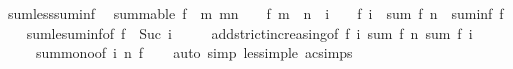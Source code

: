 \begin{isabellebody}
\isanewline
\isanewline
{}\isamarkupfalse%
\ sum{\isacharunderscore}{\kern0pt}less{\isacharunderscore}{\kern0pt}suminf{}{\isacharcolon}{\kern0pt}\isanewline
\ \ {\isachardoublequoteopen}summable\ f\ {\isasymLongrightarrow}\ {\isacharparenleft}{\kern0pt}{\isasymAnd}m{\isachardot}{\kern0pt}\ m{\isasymge}n\ {\isasymLongrightarrow}\ {}\ {\isasymle}\ f\ m{\isacharparenright}{\kern0pt}\ {\isasymLongrightarrow}\ n\ {\isasymle}\ i\ {\isasymLongrightarrow}\ {}\ {\isacharless}{\kern0pt}\ f\ i\ {\isasymLongrightarrow}\ sum\ f\ {\isacharbraceleft}{\kern0pt}{\isachardot}{\kern0pt}{\isachardot}{\kern0pt}{\isacharless}{\kern0pt}n{\isacharbraceright}{\kern0pt}\ {\isacharless}{\kern0pt}\ suminf\ f{\isachardoublequoteclose}\isanewline
%
\isadelimproof
\ \ %
\endisadelimproof
%
\isatagproof
{}\isamarkupfalse%
\ sum{\isacharunderscore}{\kern0pt}le{\isacharunderscore}{\kern0pt}suminf{\isacharbrackleft}{\kern0pt}of\ f\ {\isachardoublequoteopen}{\isacharbraceleft}{\kern0pt}{\isachardot}{\kern0pt}{\isachardot}{\kern0pt}{\isacharless}{\kern0pt}\ Suc\ i{\isacharbraceright}{\kern0pt}{\isachardoublequoteclose}{\isacharbrackright}{\kern0pt}\isanewline
\ \ \ \ \ add{\isacharunderscore}{\kern0pt}strict{\isacharunderscore}{\kern0pt}increasing{\isacharbrackleft}{\kern0pt}of\ {\isachardoublequoteopen}f\ i{\isachardoublequoteclose}\ {\isachardoublequoteopen}sum\ f\ {\isacharbraceleft}{\kern0pt}{\isachardot}{\kern0pt}{\isachardot}{\kern0pt}{\isacharless}{\kern0pt}n{\isacharbraceright}{\kern0pt}{\isachardoublequoteclose}\ {\isachardoublequoteopen}sum\ f\ {\isacharbraceleft}{\kern0pt}{\isachardot}{\kern0pt}{\isachardot}{\kern0pt}{\isacharless}{\kern0pt}i{\isacharbraceright}{\kern0pt}{\isachardoublequoteclose}{\isacharbrackright}{\kern0pt}\isanewline
\ \ \ \ \ sum{\isacharunderscore}{\kern0pt}mono{}{\isacharbrackleft}{\kern0pt}of\ {\isachardoublequoteopen}{\isacharbraceleft}{\kern0pt}{\isachardot}{\kern0pt}{\isachardot}{\kern0pt}{\isacharless}{\kern0pt}i{\isacharbraceright}{\kern0pt}{\isachardoublequoteclose}\ {\isachardoublequoteopen}{\isacharbraceleft}{\kern0pt}{\isachardot}{\kern0pt}{\isachardot}{\kern0pt}{\isacharless}{\kern0pt}n{\isacharbraceright}{\kern0pt}{\isachardoublequoteclose}\ f{\isacharbrackright}{\kern0pt}\isanewline
\ \ \isamarkupfalse%
\ {\isacharparenleft}{\kern0pt}auto\ simp{\isacharcolon}{\kern0pt}\ less{\isacharunderscore}{\kern0pt}imp{\isacharunderscore}{\kern0pt}le\ ac{\isacharunderscore}{\kern0pt}simps{\isacharparenright}{\kern0pt}%

\end{isabellebody}
